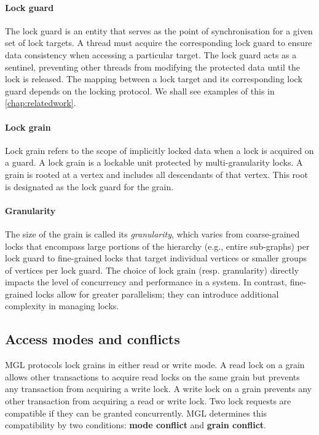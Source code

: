 \paragraph{Lock guard} The lock guard is an entity that serves as the point of synchronisation for a given set of lock targets. A thread must acquire the corresponding lock guard to ensure data consistency when accessing a particular target. The lock guard acts as a sentinel, preventing other threads from modifying the protected data until the lock is released. The mapping between a lock target and its corresponding lock guard depends on the locking protocol. We shall see examples of this in \cref{chap:relatedwork}.

\paragraph{Lock grain} Lock grain refers to the scope of implicitly locked data when a lock is acquired on a guard. A lock grain is a lockable unit protected by multi-granularity locks. A grain is rooted at a vertex and includes all descendants of that vertex. This root is designated as the lock guard for the grain.

\paragraph{Granularity} The size of the grain is called its \emph{granularity}, which varies from coarse-grained locks that encompass large portions of the hierarchy (e.g., entire sub-graphs) per lock guard to fine-grained locks that target individual vertices or smaller groups of vertices per lock guard. The choice of lock grain (resp. granularity) directly impacts the level of concurrency and performance in a system. In contrast, fine-grained locks allow for greater parallelism; they can introduce additional complexity in managing locks.

\subsection{Access modes and conflicts}

MGL protocols lock grains in either read or write mode. A read lock on a grain allows other transactions to acquire read locks on the same grain but prevents any transaction from acquiring a write lock. A write lock on a grain prevents any other transaction from acquiring a read or write lock.
Two lock requests are compatible if they can be granted concurrently. MGL determines this compatibility by two conditions: \textbf{mode conflict} and \textbf{grain conflict}. 

